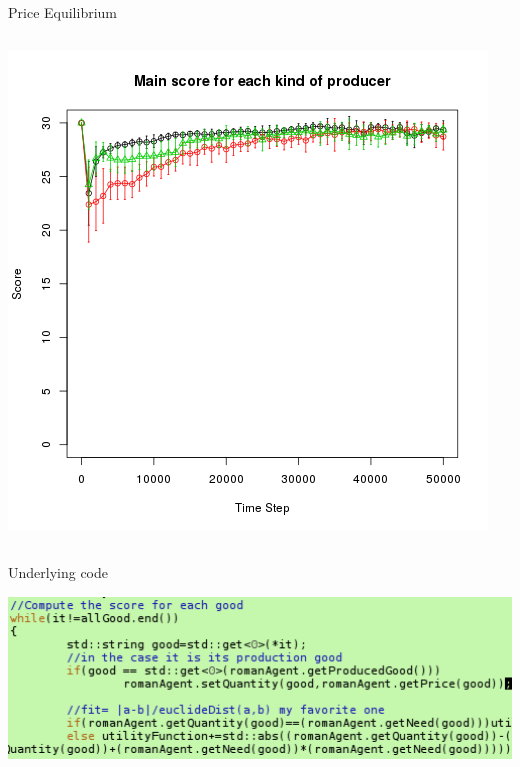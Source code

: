 \documentclass[8pt, handout=show,notes=show]{beamer}
\begin{document}
\begin{frame}{Price Equilibrium}
\begin{columns}
		 \includegraphics[width=\textwidth]{./scoreEx2.png}
	\end{columns}
	
\end{frame}



\begin{frame}{Underlying code}
	\begin{center}
		\includegraphics[width=1\textwidth]{./codePrices.png}\\
	\end{center}
\end{frame}
\end{document}
